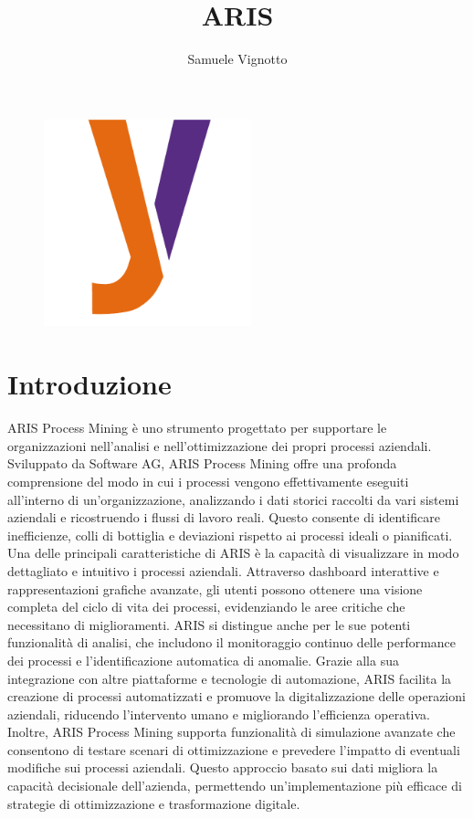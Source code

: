\documentclass{article}
\title{\Huge{\textbf{ARIS}}\vspace{-1em}}
\author{Samuele Vignotto}
\date{}
\begin{document}
\maketitle
\begin{figure}[h]
  \centering
  \includegraphics[width=6cm, height=6cm]{Logo/Y_LOGO-SOLO.png}
  \label{fig:immagine}
\end{figure}

\newpage
\tableofcontents
\newpage

\section{Introduzione}
ARIS Process Mining è uno strumento progettato per supportare le organizzazioni nell'analisi e nell'ottimizzazione dei propri processi aziendali. Sviluppato da Software AG, ARIS Process Mining offre una profonda comprensione del modo in cui i processi vengono effettivamente eseguiti all'interno di un'organizzazione, analizzando i dati storici raccolti da vari sistemi aziendali e ricostruendo i flussi di lavoro reali. Questo consente di identificare inefficienze, colli di bottiglia e deviazioni rispetto ai processi ideali o pianificati. Una delle principali caratteristiche di ARIS è la capacità di visualizzare in modo dettagliato e intuitivo i processi aziendali. Attraverso dashboard interattive e rappresentazioni grafiche avanzate, gli utenti possono ottenere una visione completa del ciclo di vita dei processi, evidenziando le aree critiche che necessitano di miglioramenti. ARIS si distingue anche per le sue potenti funzionalità di analisi, che includono il monitoraggio continuo delle performance dei processi e l'identificazione automatica di anomalie. Grazie alla sua integrazione con altre piattaforme e tecnologie di automazione, ARIS facilita la creazione di processi automatizzati e promuove la digitalizzazione delle operazioni aziendali, riducendo l'intervento umano e migliorando l'efficienza operativa. Inoltre, ARIS Process Mining supporta funzionalità di simulazione avanzate che consentono di testare scenari di ottimizzazione e prevedere l'impatto di eventuali modifiche sui processi aziendali. Questo approccio basato sui dati migliora la capacità decisionale dell'azienda, permettendo un'implementazione più efficace di strategie di ottimizzazione e trasformazione digitale.
\end{document}
